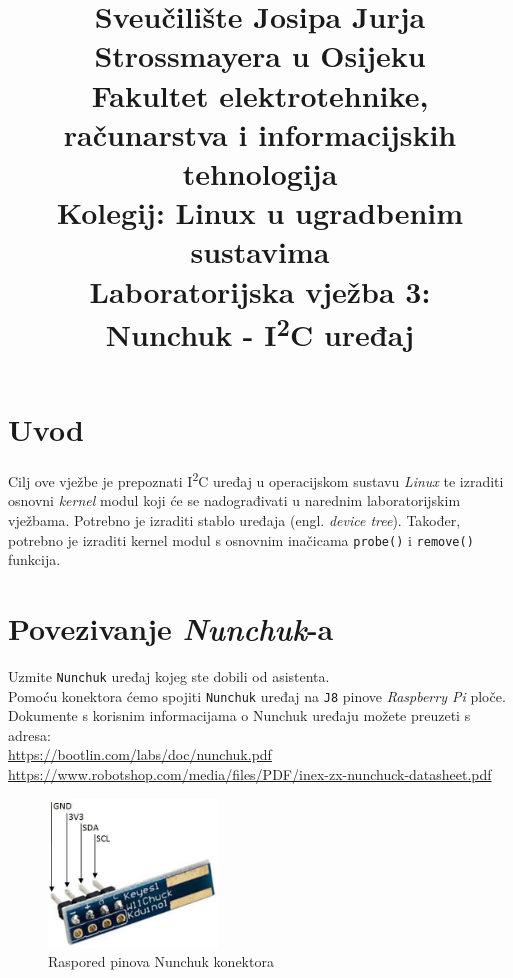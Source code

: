 \documentclass[11pt]{article}
\title{
	\Large Sveučilište Josipa Jurja Strossmayera u Osijeku \\
	Fakultet elektrotehnike, računarstva i informacijskih tehnologija \\
	\vspace{4cm}
	\Large Kolegij: Linux u ugradbenim sustavima \\
	\vspace{4cm}
	\Large \textbf{Laboratorijska vježba 3:\\
	Nunchuk - I\textsuperscript{2}C uređaj}
	}
\date{}
\begin{document}
\maketitle
\thispagestyle{empty}
\newpage

\section{Uvod}
Cilj ove vježbe je prepoznati I\textsuperscript{2}C uređaj u operacijskom
sustavu \textit{Linux} te izraditi osnovni \textit{kernel} modul koji će se
nadograđivati u narednim laboratorijskim vježbama. Potrebno je izraditi
stablo uređaja (engl. \textit{device tree}). Također, potrebno je izraditi
kernel modul s osnovnim inačicama \texttt{probe()} i \texttt{remove()} funkcija.

\section{Povezivanje \textit{Nunchuk}-a}
Uzmite \texttt{Nunchuk} uređaj kojeg ste dobili od asistenta.\\
Pomoću konektora ćemo spojiti \texttt{Nunchuk} uređaj na \texttt{J8} pinove
\textit{Raspberry Pi} ploče.\\
Dokumente s korisnim informacijama o Nunchuk uređaju možete preuzeti s adresa:\\
\url{https://bootlin.com/labs/doc/nunchuk.pdf}\\
\url{https://www.robotshop.com/media/files/PDF/inex-zx-nunchuck-datasheet.pdf}\\

\begin{figure}[h!]
\centering
\includegraphics[width=0.4\textwidth]{nunchuk-connector.jpg}
\captionsetup{justification=centering}
\caption{Raspored pinova Nunchuk konektora}
\end{figure}
\end{document}
